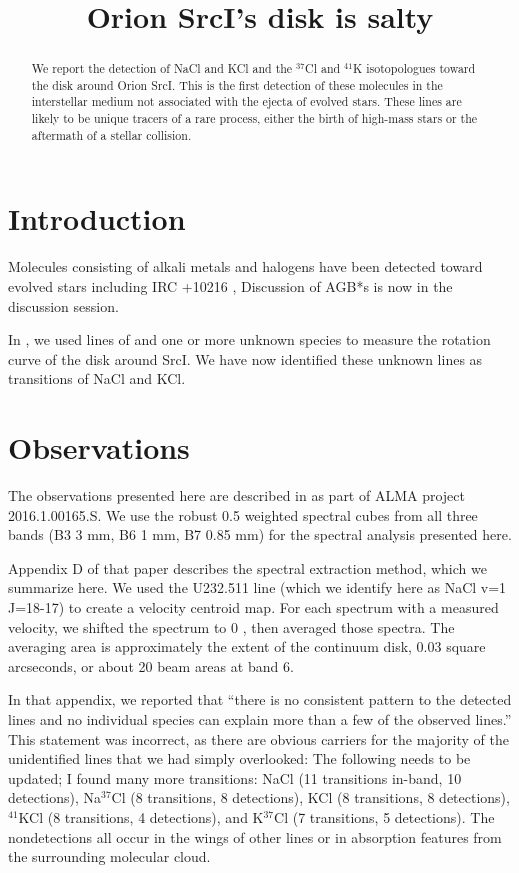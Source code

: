 \documentclass[twocolumn]{aastex62}
\newcommand{\sourcei}{SrcI\xspace}
\begin{document}


\title{Orion \sourcei's disk is salty}
\begin{abstract}
    We report the detection of NaCl and KCl and the $^{37}$Cl and $^{41}$K
    isotopologues toward the disk around Orion \sourcei.
    This is the first detection of these molecules in the interstellar
    medium not associated with the ejecta of evolved stars.
    These lines are likely to be unique tracers of a rare process, either
    the birth of high-mass stars or the aftermath of a stellar collision.
\end{abstract}

\section{Introduction}
Molecules consisting of alkali metals and halogens have been detected
toward evolved stars including IRC +10216 \citep{Cernicharo1987a}, 
{\color{red}Discussion of AGB*s is now in the discussion session.}

In \citet[][the brine paper]{Ginsburg2018b}, we used lines of
\water and one or more unknown species to measure the rotation curve of
the disk around \sourcei.  We have now identified these unknown lines as
transitions of NaCl and KCl.

\section{Observations}
The observations presented here are described in \citet{Ginsburg2018a} as part
of ALMA project 2016.1.00165.S.  We use the robust 0.5 weighted spectral cubes
from all three bands (B3 3 mm, B6 1 mm, B7 0.85 mm) for the spectral analysis
presented here.

Appendix D of that paper describes the spectral extraction method,
which we summarize here.  We used the U232.511 line (which we identify here as
NaCl v=1 J=18-17) to create a velocity centroid map.  For each spectrum with
a measured velocity, we shifted the spectrum to 0 \kms, then averaged those
spectra.  The averaging area is approximately the extent of the continuum
disk, 0.03 square arcseconds, or about 20 beam areas at band 6.

In that appendix, we reported that ``there is no consistent pattern to the
detected lines and no individual species can explain more than a few of the
observed lines.''  This statement was incorrect, as there are obvious carriers
for the majority of the unidentified lines that we had simply overlooked:
{\color{red}The following needs to be updated; I found many more transitions:}
NaCl (11 transitions in-band, 10 detections), Na$^{37}$Cl (8 transitions, 8
detections), KCl (8 transitions, 8 detections), $^{41}$KCl (8 transitions, 4
detections), and K$^{37}$Cl (7 transitions, 5 detections).
The nondetections all occur in the wings of other lines or in absorption
features from the surrounding molecular cloud.
\end{document}
